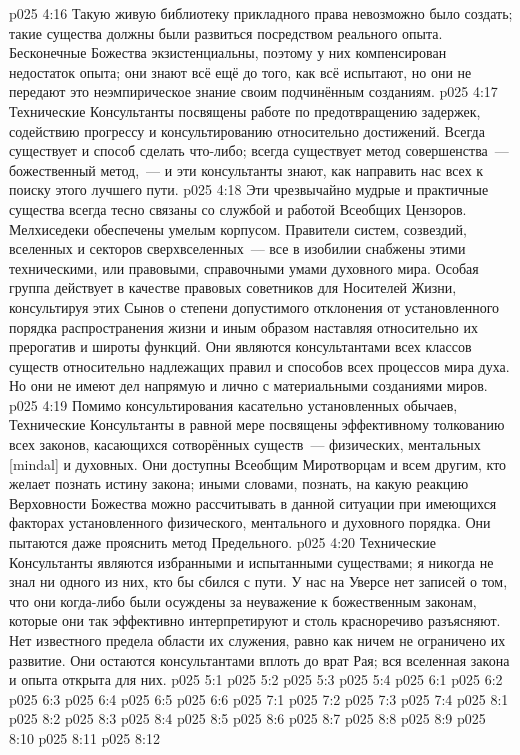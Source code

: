 \vs p025 4:16 Такую живую библиотеку прикладного права невозможно было создать; такие существа должны были развиться посредством реального опыта. Бесконечные Божества экзистенциальны, поэтому у них компенсирован недостаток опыта; они знают всё ещё до того, как всё испытают, но они не передают это неэмпирическое знание своим подчинённым созданиям.
\vs p025 4:17 \pc Технические Консультанты посвящены работе по предотвращению задержек, содействию прогрессу и консультированию относительно достижений. Всегда существует  и  способ сделать что\hyp{}либо; всегда существует метод совершенства~--- божественный метод,~--- и эти консультанты знают, как направить нас всех к поиску этого лучшего пути.
\vs p025 4:18 Эти чрезвычайно мудрые и практичные существа всегда тесно связаны со службой и работой Всеобщих Цензоров. Мелхиседеки обеспечены умелым корпусом. Правители систем, созвездий, вселенных и секторов сверхвселенных~--- все в изобилии снабжены этими техническими, или правовыми, справочными умами духовного мира. Особая группа действует в качестве правовых советников для Носителей Жизни, консультируя этих Сынов о степени допустимого отклонения от установленного порядка распространения жизни и иным образом наставляя относительно их прерогатив и широты функций. Они являются консультантами всех классов существ относительно надлежащих правил и способов всех процессов мира духа. Но они не имеют дел напрямую и лично с материальными созданиями миров.
\vs p025 4:19 Помимо консультирования касательно установленных обычаев, Технические Консультанты в равной мере посвящены эффективному толкованию всех законов, касающихся сотворённых существ~--- физических, ментальных [mindal] и духовных. Они доступны Всеобщим Миротворцам и всем другим, кто желает познать истину закона; иными словами, познать, на какую реакцию Верховности Божества можно рассчитывать в данной ситуации при имеющихся факторах установленного физического, ментального и духовного порядка. Они пытаются даже прояснить метод Предельного.
\vs p025 4:20 Технические Консультанты являются избранными и испытанными существами; я никогда не знал ни одного из них, кто бы сбился с пути. У нас на Уверсе нет записей о том, что они когда\hyp{}либо были осуждены за неуважение к божественным законам, которые они так эффективно интерпретируют и столь красноречиво разъясняют. Нет известного предела области их служения, равно как ничем не ограничено их развитие. Они остаются консультантами вплоть до врат Рая; вся вселенная закона и опыта открыта для них.
\vs p025 5:1 
\vs p025 5:2 
\vs p025 5:3 
\vs p025 5:4 
\vs p025 6:1 
\vs p025 6:2 
\vs p025 6:3 
\vs p025 6:4 
\vs p025 6:5 
\vs p025 6:6 
\vs p025 7:1 
\vs p025 7:2 
\vs p025 7:3 
\vs p025 7:4 
\vs p025 8:1 
\vs p025 8:2 
\vs p025 8:3 
\vs p025 8:4 
\vs p025 8:5 \pc 
\vs p025 8:6 
\vs p025 8:7 
\vs p025 8:8 \pc 
\vs p025 8:9 \pc 
\vs p025 8:10 
\vs p025 8:11 
\vsetoff
\vs p025 8:12 
\quizlink
